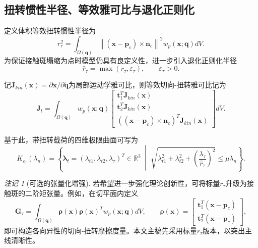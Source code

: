 ﻿\documentclass[12pt, a4paper]{ctexart}
\theoremstyle{plain}
\theoremstyle{remark}
\newtheorem{remark}{注记}
\begin{document}
\subsection{扭转惯性半径、等效雅可比与退化正则化}
定义体积等效扭转惯性半径为
\begin{equation}\label{eq:rtau}
    r_{\tau}^2 = \int_{\Omega(\bm{q})} \left\| (\bm{x} - \bm{p}_c) \times \bm{n}_c \right\|^2 w_p(\bm{x};\bm{q}) dV .
\end{equation}
为保证接触斑塌缩为点时模型仍具有良定义性，进一步引入退化正则化半径
\begin{equation}\label{eq:rtau_hat}
    \hat{r}_{\tau} = \max(r_{\tau}, \varepsilon_{\tau}),
    \qquad \varepsilon_{\tau} > 0 .
\end{equation}

记$\bm{J}_{kin}(\bm{x}) = \partial \dot{\bm{x}} / \partial \dot{\bm{q}}$为局部运动学雅可比，则等效切向-扭转雅可比记为
\begin{equation}\label{eq:Jt}
    \bm{J}_t = \int_{\Omega(\bm{q})} w_p(\bm{x};\bm{q})
    \begin{bmatrix}
        \bm{t}_1^T \bm{J}_{kin}(\bm{x}) \\
        \bm{t}_2^T \bm{J}_{kin}(\bm{x}) \\
        ((\bm{x} - \bm{p}_c) \times \bm{n}_c)^T \bm{J}_{kin}(\bm{x})
    \end{bmatrix} dV .
\end{equation}

基于此，带扭转载荷的四维极限曲面可写为
\begin{equation}\label{eq:cone_reg}
    K_{\varepsilon_{\tau}}(\lambda_n) =
    \left\{
        \bm{\lambda}_t = (\lambda_{t1}, \lambda_{t2}, \lambda_{\tau})^T \in \mathbb{R}^3
        \;\middle|\;
        \sqrt{\lambda_{t1}^2 + \lambda_{t2}^2 + \left( \frac{\lambda_{\tau}}{\hat{r}_{\tau}} \right)^2}
        \le \mu \lambda_n
    \right\}.
\end{equation}

\begin{remark}[可选的张量化增强]
若希望进一步强化理论创新性，可将标量$r_{\tau}$升级为接触斑的二阶矩张量。例如，在切平面内定义
\begin{equation}
    \bm{G}_{\tau} = \int_{\Omega(\bm{q})} \bm{\rho}(\bm{x}) \bm{\rho}(\bm{x})^T w_p(\bm{x};\bm{q}) dV,
    \qquad
    \bm{\rho}(\bm{x}) =
    \begin{bmatrix}
        \bm{t}_1^T (\bm{x} - \bm{p}_c) \\
        \bm{t}_2^T (\bm{x} - \bm{p}_c)
    \end{bmatrix},
\end{equation}
即可构造各向异性的切向-扭转摩擦度量。本文主稿先采用标量$r_{\tau}$版本，以突出主线清晰性。
\end{remark}
\end{document}

